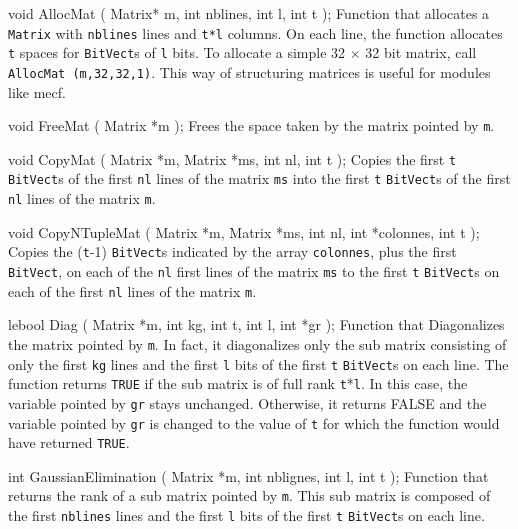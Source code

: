 \code


void AllocMat ( Matrix* m,
                int nblines,
                int l,
                int t
              );
\endcode
 \tab
Function that allocates a {\tt Matrix} with {\tt nblines} lines and {\tt t*l} columns.
On each line, the function allocates {\tt t} spaces for {\tt BitVect}s of {\tt l} bits.
To allocate a simple 32 $\times$ 32 bit matrix, call
{\tt AllocMat (m,32,32,1)}.  This way of structuring matrices is useful for modules like mecf.
 \endtab

\code


void FreeMat ( Matrix *m
             );
\endcode
 \tab
Frees the space taken by the matrix pointed by {\tt m}.
 \endtab

\code


void CopyMat ( Matrix *m, 
               Matrix *ms, 
               int nl, 
               int t 
             );
\endcode
 \tab
Copies the first {\tt t} {\tt BitVect}s of the first {\tt nl} lines of the matrix {\tt ms} into the
first {\tt t} {\tt BitVect}s of the first {\tt nl} lines of the matrix {\tt m}.
 \endtab

\code


void CopyNTupleMat ( Matrix *m, 
                     Matrix *ms, 
                     int nl,
                     int *colonnes, 
                     int t 
                   );
\endcode
 \tab
Copies the ({\tt t}-1) {\tt BitVect}s indicated by the array {\tt colonnes}, plus the first {\tt BitVect}, on each of the
{\tt nl} first lines of the matrix {\tt ms} to the first {\tt t} {\tt BitVect}s on each of the first {\tt nl}
lines of the matrix {\tt m}.
 \endtab
\code


lebool Diag ( Matrix *m, 
               int kg,                                
               int t, 
               int l, 
               int *gr 
             );
\endcode
 \tab
Function that Diagonalizes the matrix pointed by {\tt m}.  In fact, it diagonalizes only the sub matrix consisting
of only the first {\tt kg} lines and the first {\tt l} bits of the first {\tt t} {\tt BitVect}s on each line.
The function returns {\tt TRUE} if the sub matrix is of full rank {\tt t}*{\tt l}.  In this case, the variable pointed by {\tt gr}
stays unchanged.  Otherwise, it returns FALSE and the variable pointed by {\tt gr} is changed to the value of {\tt t} for which
the function would have returned {\tt TRUE}.
 \endtab

\code


int GaussianElimination ( Matrix *m, 
                          int nblignes,
                          int l,
                          int t
                        );
\endcode
 \tab
Function that returns the rank of a sub matrix pointed by {\tt m}.  This sub matrix is
composed of the first {\tt nblines} lines and the first {\tt l} bits of the first {\tt t} {\tt BitVect}s on each line.
 \endtab

